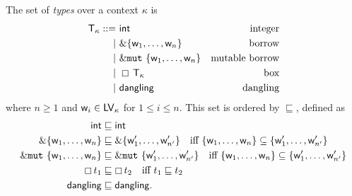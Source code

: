 \begin{definition}[Types]
  The set of \emph{types} over a context $\kappa$ is
  \begin{align*}
    \mathsf{T}_\kappa ::=&\ \mathsf{int} & \text{integer}\\
    | &\ \&\{\mathsf{w}_1,\ldots,\mathsf{w}_n\} & \text{borrow}\\
    | &\ \&\mathtt{mut}\ \{\mathsf{w}_1,\ldots,\mathsf{w}_n\} & \text{mutable borrow}\\
    | &\ \boxempty\,{\mathsf{T}_\kappa} & \text{box}\\
    | &\ \mathsf{dangling} & \text{dangling}
  \end{align*}
  where $n\ge 1$ and $\mathsf{w}_i\in\mathsf{LV}_\kappa$ for $1\le i\le n$.
  This set is ordered by $\sqsubseteq$, defined as
  \begin{align*}
    \mathsf{int}&\sqsubseteq\mathsf{int}\\
    \&\{\mathsf{w}_1,\ldots,\mathsf{w}_n\} & \sqsubseteq
    \&\{\mathsf{w}'_1,\ldots,\mathsf{w}'_{n'}\} \quad\text{iff $\{\mathsf{w}_1,\ldots,\mathsf{w}_n\}\subseteq\{\mathsf{w}'_1,\ldots,\mathsf{w}'_{n'}\}$}\\
    \&\mathtt{mut}\ \{\mathsf{w}_1,\ldots,\mathsf{w}_n\} & \sqsubseteq
    \&\mathtt{mut}\ \{\mathsf{w}'_1,\ldots,\mathsf{w}'_{n'}\} \quad\text{iff $\{\mathsf{w}_1,\ldots,\mathsf{w}_n\}\subseteq\{\mathsf{w}'_1,\ldots,\mathsf{w}'_{n'}\}$}\\
    \boxempty\,{t_1}&\sqsubseteq\boxempty\,{t_2} \quad\text{iff $t_1\sqsubseteq t_2$}\\
    \mathsf{dangling}&\sqsubseteq\mathsf{dangling.}
  \end{align*}
\end{definition}


